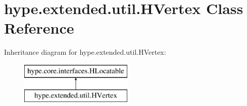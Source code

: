 \hypertarget{classhype_1_1extended_1_1util_1_1_h_vertex}{\section{hype.\-extended.\-util.\-H\-Vertex Class Reference}
\label{classhype_1_1extended_1_1util_1_1_h_vertex}
}
Inheritance diagram for hype.\-extended.\-util.\-H\-Vertex\-:\begin{figure}[H]
\begin{center}
\leavevmode
\includegraphics[height=2.000000cm]{classhype_1_1extended_1_1util_1_1_h_vertex}
\end{center}
\end{figure}
